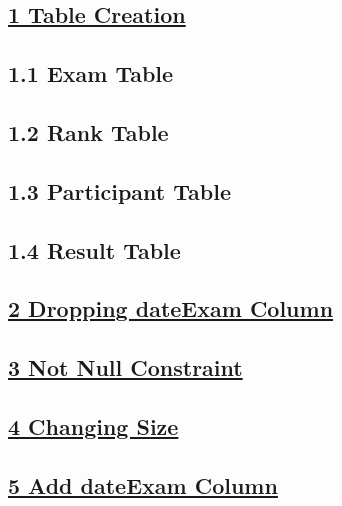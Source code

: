 \vspace{0.35cm}
\subsection*{\underline{1 Table Creation}}
\subsection*{1.1 Exam Table}


\subsection*{1.2 Rank Table}


\newpage
\subsection*{1.3 Participant Table}


\subsection*{1.4 Result Table}


\vspace{0.35cm}
\subsection*{\underline{2 Dropping dateExam Column}}


\vspace{0.35cm}
\subsection*{\underline{3 Not Null Constraint}}


\vspace{0.35cm}
\subsection*{\underline{4 Changing Size}}


\vspace{0.35cm}
\subsection*{\underline{5 Add dateExam Column}}



